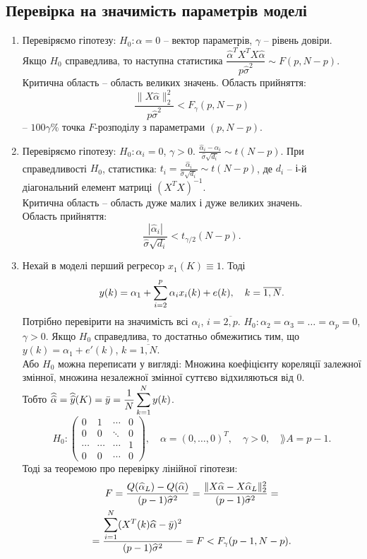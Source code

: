 \subsection{Перевірка на значимість параметрів моделі}
\begin{enumerate}
	\item Перевіряємо гіпотезу: $H_0:\alpha=0$ -- вектор параметрів, $\gamma$ -- рівень довіри. \\

	Якщо $H_0$ справедлива, то наступна статистика $\dfrac{\widehat{\alpha}^TX^TX\widehat{\alpha}}{p\widehat{\sigma}^2} \sim F(p, N-p)$. \\

	Критична область -- область великих значень. Область прийняття: \[ \dfrac{\|X\widehat{\alpha}\|_2^2}{p\widehat{\sigma}^2} < F_\gamma(p,N-p)\] -- $100\gamma\%$ точка $F$-розподілу з параметрами $(p,N-p)$.
	\item Перевіряємо гіпотезу: $H_0: \alpha_i = 0$, $\gamma>0$. $\frac{\widehat{\alpha}_i-\alpha_i}{\widehat{\sigma}\sqrt{d_i}} \sim t(N-p)$. При справедливості $H_0$, статистика: $t_i = \frac{\widehat{\alpha}_i}{\widehat{\sigma}\sqrt{d_i}} \sim t(N-p)$, де $d_i$ -- $і$-й діагональний елемент матриці $(X^TX)^{-1}$. \\

	Критична область -- область дуже малих і дуже великих значень. \\

	Область прийняття: \[\dfrac{|\widehat{\alpha}_i|}{\widehat{\sigma}\sqrt{d_i}} < t_{\gamma/2}(N-p).\]
	\item Нехай в моделі перший регресоp $x_1(K) \equiv 1$. Тоді \[y(k) = \alpha_1 + \displaystyle\sum\limits_{i=2}^p \alpha_i x_i(k) + e(k), \quad k = \overline{1,N}.\] Потрібно перевірити на значимість всі $\alpha_i$, $i=\overline{2,p}$. $H_0: \alpha_2 = \alpha_3 = \ldots = \alpha_p = 0$, $\gamma > 0$. Якщо $H_0$ справедлива, то достатньо обмежитись тим, що $y(k)= \alpha_1 + e'(k)$, $k = \overline{1,N}$. \\

	Або $H_0$ можна переписати у вигляді: Множина коефіцієнту кореляції залежної змінної, множина незалежної змінної суттєво відхиляються від 0. \\

	Тобто $\widehat{\widehat{\alpha}} = \widehat{\widehat{y}}(K) = \bar{y} = \dfrac{1}{N} \displaystyle\sum\limits_{k=1}^N y(k)$.
	\[H_0: \begin{pmatrix} 0 & 1 & \cdots & 0 \\
 0 & 0 & \ddots & 0 \\
 \cdots & \cdots & \cdots & 1 \\
 0 & 0 & \cdots & 0\end{pmatrix}, \quad \alpha = (0, \ldots, 0)^T,\quad  \gamma > 0, \quad \rang  A = p - 1. \]
	Тоді за теоремою про перевірку лінійної гіпотези:
	\begin{multline*}
		F = \dfrac{Q(\widehat{\alpha}_L)-Q(\widehat{\alpha})}{(p-1)\widehat{\sigma}^2} = \dfrac{\|X\widehat{\alpha}-X\widehat{\alpha}_L\|_2^2}{(p-1)\widehat{\sigma}^2} = \\
		= \dfrac{\displaystyle\sum\limits_{i=1}^N (X^T(k)\widehat{\alpha}-\bar{y})^2}{(p-1)\widehat{\sigma}^2} = F < F_\gamma(p-1,N-p).
	\end{multline*}
\end{enumerate}
